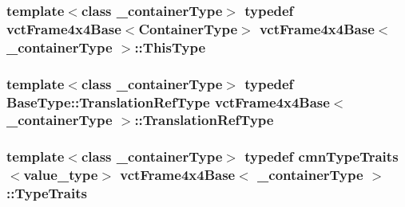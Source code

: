 \hypertarget{classvct_frame4x4_base_af6dcf167c0c3965872a095ce28853598}{
\subsubsection[{This\-Type}]{\setlength{\rightskip}{0pt plus 5cm}template$<$class \-\_\-container\-Type$>$ typedef {\bf vct\-Frame4x4\-Base}$<${\bf Container\-Type}$>$ {\bf vct\-Frame4x4\-Base}$<$ \-\_\-container\-Type $>$\-::{\bf This\-Type}}}\label{classvct_frame4x4_base_af6dcf167c0c3965872a095ce28853598}
\hypertarget{classvct_frame4x4_base_a0450063a4ebdf0f0c87c7f3fa789a17f}{
\subsubsection[{Translation\-Ref\-Type}]{\setlength{\rightskip}{0pt plus 5cm}template$<$class \-\_\-container\-Type$>$ typedef Base\-Type\-::\-Translation\-Ref\-Type {\bf vct\-Frame4x4\-Base}$<$ \-\_\-container\-Type $>$\-::{\bf Translation\-Ref\-Type}}}\label{classvct_frame4x4_base_a0450063a4ebdf0f0c87c7f3fa789a17f}
\hypertarget{classvct_frame4x4_base_ac03fa3e28721aea50a67d65e86963bd7}{
\subsubsection[{Type\-Traits}]{\setlength{\rightskip}{0pt plus 5cm}template$<$class \-\_\-container\-Type$>$ typedef {\bf cmn\-Type\-Traits}$<$value\-\_\-type$>$ {\bf vct\-Frame4x4\-Base}$<$ \-\_\-container\-Type $>$\-::{\bf Type\-Traits}}}\label{classvct_frame4x4_base_ac03fa3e28721aea50a67d65e86963bd7}


